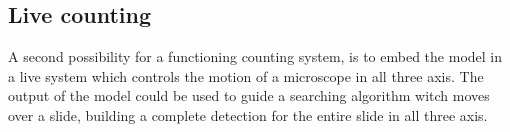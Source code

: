 \subsection*{Live counting}
A second possibility for a functioning counting system, is to embed the model in a live system which controls the motion of a microscope in all three axis.
The output of the model could be used to guide a searching algorithm witch moves over a slide, building a complete detection for the entire slide in all three axis.
